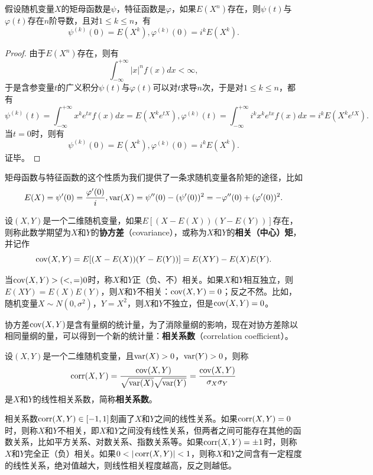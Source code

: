 \begin{property}
假设随机变量$X$的矩母函数是$\psi$，特征函数是$\varphi$，如果$E(X^n)$存在，则$\psi(t)$与$\varphi(t)$存在$n$阶导数，且对$1\le k\le n$，有
\[
    \psi^{(k)}(0)=E(X^k), \varphi^{(k)}(0)=i^k E(X^k).
\]
\end{property}
\begin{proof}
由于$E(X^n)$存在，则有
\[
    \int_{-\infty}^{+\infty} |x|^n f(x) dx < \infty,
\]
于是含参变量$t$的广义积分$\psi(t)$与$\varphi(t)$可以对$t$求导$n$次，于是对$1\le k \le n$，都有
\[
    \psi^{(k)}(t) = \int_{-\infty}^{+\infty} x^k e^{tx} f(x) dx = E(X^k e^{tX}),\varphi^{(k)}(t) = \int_{-\infty}^{+\infty} i^k x^k e^{tx} f(x) dx = i^k E(X^k e^{tX}).
\]
当$t=0$时，则有
\[
    \psi^{(k)}(0)=E(X^k), \varphi^{(k)}(0)=i^k E(X^k).
\]
证毕。
\end{proof}
矩母函数与特征函数的这个性质为我们提供了一条求随机变量各阶矩的途径，比如
\[
    E(X) = \psi'(0) = \frac{\varphi'(0)}{i}, \operatorname{\mathrm{var}}(X) = \psi''(0) - (\psi'(0))^2 = -\varphi''(0) + (\varphi'(0))^2.
\]

\begin{definition}[协方差]
设$(X,Y)$是一个二维随机变量，如果$E[(X-E(X))(Y-E(Y))]$存在，则称此数学期望为$X$和$Y$的\textbf{协方差}（covariance），或称为$X$和$Y$的\textbf{相关（中心）矩}，并记作
\[
    \operatorname{\mathrm{cov}}(X,Y) = E[(X-E(X))(Y-E(Y))] = E(XY)-E(X)E(Y).
\]
\end{definition}
当$\operatorname{\mathrm{cov}}(X,Y)>(<,=)0$时，称$X$和$Y$正（负、不）相关。如果$X$和$Y$相互独立，则$E(XY)=E(X)E(Y)$，则$X$和$Y$不相关：$\operatorname{\mathrm{cov}}(X,Y)=0$；反之不然。比如，随机变量$X\sim N(0,\sigma^2)$，$Y=X^2$，则$X$和$Y$不独立，但是$\operatorname{\mathrm{cov}}(X,Y)=0$。

协方差$\operatorname{\mathrm{cov}}(X,Y)$是含有量纲的统计量，为了消除量纲的影响，现在对协方差除以相同量纲的量，可以得到一个新的统计量：\textbf{相关系数}（correlation coefficient）。
\begin{definition}[相关系数]
设$(X,Y)$是一个二维随机变量，且$\operatorname{\mathrm{var}}(X)>0$，$\operatorname{\mathrm{var}}(Y)>0$，则称
\[
    \operatorname{\mathrm{corr}}(X,Y) = \frac{\operatorname{\mathrm{cov}}(X,Y)}{\sqrt{\operatorname{\mathrm{var}}(X)}\sqrt{\operatorname{\mathrm{var}}(Y)}} = \frac{\operatorname{\mathrm{cov}}(X,Y)}{\sigma_X\sigma_Y}
\]
是$X$和$Y$的线性相关系数，简称\textbf{相关系数}。
\end{definition}
相关系数$\operatorname{\mathrm{corr}}(X,Y)\in [-1,1]$刻画了$X$和$Y$之间的线性关系。如果$\operatorname{\mathrm{corr}}(X,Y)=0$时，则称$X$和$Y$不相关，即$X$和$Y$之间没有线性关系，但两者之间可能存在其他的函数关系，比如平方关系、对数关系、指数关系等。如果$\operatorname{\mathrm{corr}}(X,Y)=\pm 1$时，则称$X$和$Y$完全正（负）相关。如果$0<|\corr(X,Y)|<1$，则称$X$和$Y$之间含有一定程度的线性关系，绝对值越大，则线性相关程度越高，反之则越低。

